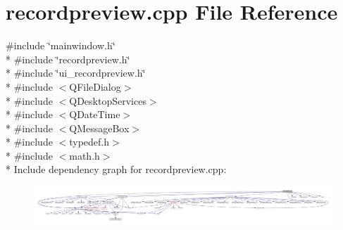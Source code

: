 \hypertarget{a00129}{\section{recordpreview.\+cpp File Reference}
\label{a00129}
}
{\ttfamily \#include \char`\"{}mainwindow.\+h\char`\"{}}\\*
{\ttfamily \#include \char`\"{}recordpreview.\+h\char`\"{}}\\*
{\ttfamily \#include \char`\"{}ui\+\_\+recordpreview.\+h\char`\"{}}\\*
{\ttfamily \#include $<$Q\+File\+Dialog$>$}\\*
{\ttfamily \#include $<$Q\+Desktop\+Services$>$}\\*
{\ttfamily \#include $<$Q\+Date\+Time$>$}\\*
{\ttfamily \#include $<$Q\+Message\+Box$>$}\\*
{\ttfamily \#include $<$typedef.\+h$>$}\\*
{\ttfamily \#include $<$math.\+h$>$}\\*
Include dependency graph for recordpreview.\+cpp\+:
\nopagebreak
\begin{figure}[H]
\begin{center}
\leavevmode
\includegraphics[width=350pt]{df/df1/a00340}
\end{center}
\end{figure}
